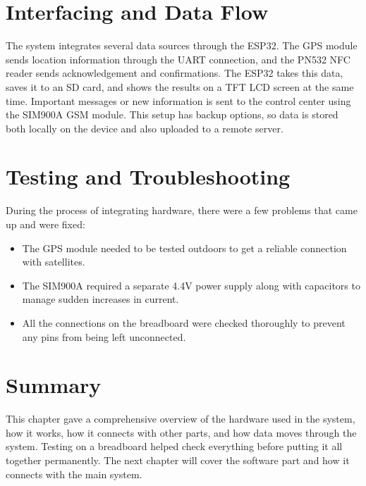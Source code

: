 \section{Interfacing and Data Flow}
The system integrates several data sources through the ESP32. The GPS module sends location information through the UART connection, and the PN532 NFC reader sends acknowledgement and confirmations. The ESP32 takes this data, saves it to an SD card, and shows the results on a TFT LCD screen at the same time. Important messages or new information is sent to the control center using the SIM900A GSM module. This setup has backup options, so data is stored both locally on the device and also uploaded to a remote server.

\section{Testing and Troubleshooting}
During the process of integrating hardware, there were a few problems that came up and were fixed:
\begin{itemize}
    \item The GPS module needed to be tested outdoors to get a reliable connection with satellites.
    \item The SIM900A required a separate 4.4V power supply along with capacitors to manage sudden increases in current.
    \item All the connections on the breadboard were checked thoroughly to prevent any pins from being left unconnected.
\end{itemize}

\section{Summary}
This chapter gave a comprehensive overview of the hardware used in the system, how it works, how it connects with other parts, and how data moves through the system. Testing on a breadboard helped check everything before putting it all together permanently. The next chapter will cover the software part and how it connects with the main system.
